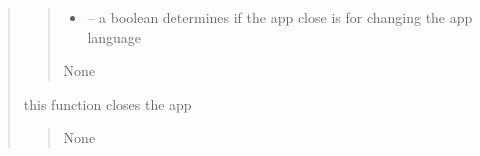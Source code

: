 \documentclass[letterpaper,10pt,english]{sphinxmanual}
\begin{document}
\begin{quote}
\begin{savenotes}
\begin{fulllineitems}
\begin{savenotes}
\begin{fulllineitems}
\begin{quote}
\begin{description}
\begin{itemize}
\item {} 
\sphinxAtStartPar
{} – a boolean determines if the app close is for changing the app language

\end{itemize}

\sphinxAtStartPar
None

\end{description}\end{quote}

\end{fulllineitems}\end{savenotes}


\begin{savenotes}\begin{fulllineitems}
\label{\detokenize{setting/setting_UI:oxin.setting_UI.UI_main_window.close_win}}
\pysigstartsignatures
{}
\pysigstopsignatures
\sphinxAtStartPar
this function closes the app
\begin{quote}\begin{description}
\sphinxAtStartPar
None

\end{description}\end{quote}

\end{fulllineitems}\end{savenotes}


\begin{savenotes}\begin{fulllineitems}
\label{\detokenize{setting/setting_UI:oxin.setting_UI.UI_main_window.combo_image_preccess}}
\pysigstartsignatures
{}
\pysigstopsignatures
\end{fulllineitems}\end{savenotes}



\end{fulllineitems}
\end{savenotes}
\end{quote}
\end{document}
